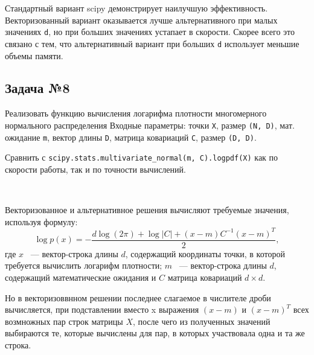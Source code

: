 \documentclass{article}
\begin{document}
\analysis

Стандартный вариант scipy демонстрирует наилучшую эффективность. 
Векторизованный вариант оказывается лучше альтернативного при малых значениях \verb"d",
но при больших значениях устапает в скорости. Скорее всего это связано с тем, что
альтернативный вариант при больших \verb"d" использует меньшие объемы памяти.

\subsection{Задача №8}

\taskdesc
Реализовать функцию вычисления логарифма плотности многомерного нормального распределения
Входные параметры: точки \verb"X", размер \verb"(N, D)", мат. ожидание \verb"m", вектор длины \verb"D", 
матрица ковариаций \verb"C", размер \verb"(D, D)". 

Сравнить с \verb"scipy.stats.multivariate_normal(m, C).logpdf(X)" как по скорости работы, так и по точности вычислений.

\soldesc\\
\begin{minipage}{\linewidth}

\end{minipage}
\begin{minipage}{\linewidth}

\end{minipage}
\begin{minipage}{\linewidth}

\end{minipage}

Векторизованное и альтернативное решения вычисляют требуемые значения, используя формулу:
$$
\log{p(x)} = - \frac{d \log{(2\pi)} + \log{|C|} + (x - m)C^{-1}(x-m)^T}{2},
$$
где $x$ ~--- вектор-строка длины $d$, содержащий координаты точки, в которой требуется вычислить логарифм плотности;
$m$ ~--- вектор-строка длины $d$, содержащий математические ожидания и $C$ матрица ковариаций $d \times d$.

Но в векторизоввнном решении последнее слагаемое в числителе дроби вычисляется, при подставлении
вместо x выражения $(x - m)$ и $(x - m)^T$ всех возмножных пар строк матрицы $X$, после чего из полученных
значений выбираются те, которые вычислены для пар, в которых участвовала одна и та же строка.
\end{document}
